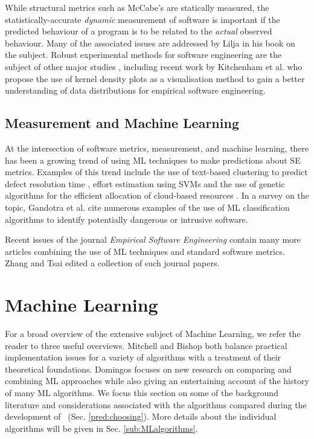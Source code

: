 While structural metrics such as McCabe's are statically measured, the statistically-accurate \textit{dynamic} measurement of software is important if the predicted behaviour of a program is to be related to the \textit{actual} observed behaviour. Many of the associated issues are addressed by Lilja \cite{LiljaJ} in his book on the subject. Robust experimental methods for software engineering are the subject of other major studies \cite{AdvancedESE}, including recent work by Kitchenham et al. \cite{Kitchenham2016} who propose the use of kernel density plots as a visualisation method to gain a better understanding of data distributions for empirical software engineering.

\subsection{Measurement and Machine Learning}
\label{sub:lrmmml}

At the intersection of software metrics, measurement, and machine learning, there has been a growing trend of using ML techniques to make predictions about SE metrics. Examples of this trend include the use of text-based clustering to predict defect resolution time \cite{Assar2016}, effort estimation using SVMs \cite{Song:2014:PBR:2639490.2639510} and the use of genetic algorithms for the efficient allocation of cloud-based resources \cite{cloudML}. In a survey on the topic, Gandotra et al. \cite{ClassificationSurvey} cite numerous examples of the use of ML classification algorithms to identify potentially dangerous or intrusive software. 

Recent issues of the journal \textit{Empirical Software Engineering} contain many more articles combining the use of ML techniques and standard software metrics. Zhang and Tsai \cite{ML4SE} edited a collection of such journal papers.  

\section{Machine Learning}
\label{sec:lrml}

For a broad overview of the extensive subject of Machine Learning, we refer the reader to three useful overviews. 
Mitchell \cite{Mitchell} and Bishop \cite{Bishop} both balance practical implementation issues for a variety of algorithms with a treatment of their theoretical foundations. 
Domingos \cite{domingos2015master} focuses on new research on comparing and combining ML approaches while also giving an entertaining account of the history of many ML algorithms.  
We focus this section on some of the background literature and considerations associated with the algorithms compared during the development of \where~(Sec. \ref{pred:choosing}).
More details about the individual algorithms will be given in Sec. \ref{sub:MLalgorithms}.

